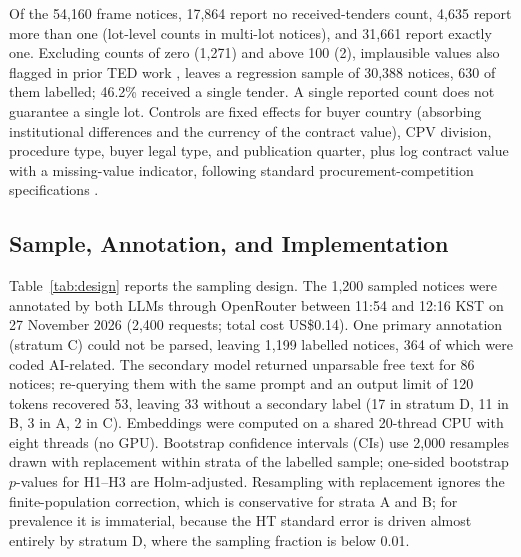 \documentclass[runningheads]{llncs}
\begin{document}
Of the 54,160 frame notices, 17,864 report no received-tenders count, 4,635 report more than one (lot-level counts in multi-lot notices), and 31,661 report exactly one. Excluding counts of zero (1,271) and above 100 (2), implausible values also flagged in prior TED work \cite{potin2023}, leaves a regression sample of 30,388 notices, 630 of them labelled; 46.2\% received a single tender. A single reported count does not guarantee a single lot. %
Controls are fixed effects for buyer country (absorbing institutional differences and the currency of the contract value), CPV division, %
procedure type, buyer legal type, and publication quarter, plus log contract value with a missing-value indicator, following standard procurement-competition specifications \cite{fazekas2016,decarolis2022}.

\subsection{Sample, Annotation, and Implementation}
Table~\ref{tab:design} reports the sampling design. The 1,200 sampled notices were annotated by both LLMs through OpenRouter between 11:54 and 12:16 KST on 27 November 2026 (2,400 requests; total cost US\$0.14). One primary annotation (stratum C) could not be parsed, leaving 1,199 labelled notices, 364 of which were coded AI-related. The secondary model returned unparsable free text for 86 notices; re-querying them with the same prompt and an output limit of 120 tokens recovered 53, leaving 33 without a secondary label (17 in stratum D, 11 in B, 3 in A, 2 in C). %
Embeddings were computed on a shared 20-thread CPU with eight threads (no GPU). Bootstrap confidence intervals (CIs) use 2,000 resamples drawn with replacement within strata of the labelled sample; %
one-sided bootstrap $p$-values for H1--H3 are Holm-adjusted. Resampling with replacement ignores the finite-population correction, which is conservative for strata A and B; for prevalence it is immaterial, because the HT standard error is driven almost entirely by stratum D, where the sampling fraction is below 0.01.
\end{document}
